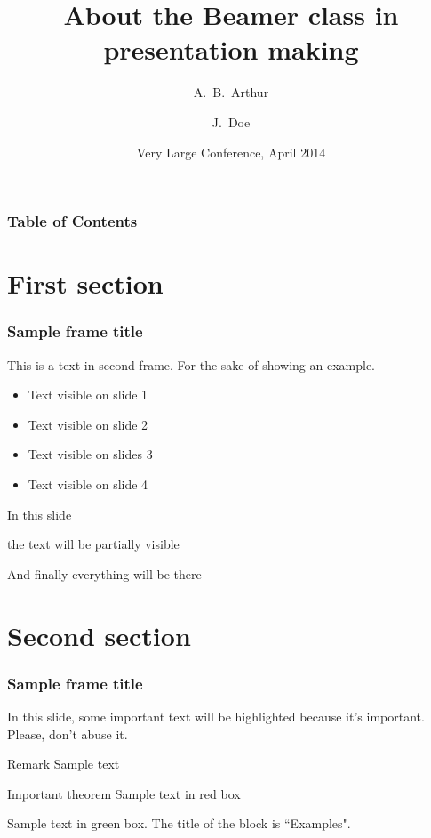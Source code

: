 \documentclass[aspectratio=169]{beamer}
\title[About Beamer] %
{About the Beamer class in presentation making}
\author[Arthur, Doe] %
{A.~B.~Arthur\inst{1} \and J.~Doe\inst{2}}
\institute[VFU] %
{
  \inst{1} Faculty of Physics\\
  Very Famous University
  \and
  \inst{2} Faculty of Chemistry\\
  Very Famous University
}
\date[VLC 2014] %
{Very Large Conference, April 2014}
\begin{document}
\frame{\titlepage}


\begin{frame}
\frametitle{Table of Contents}
\tableofcontents
\end{frame}


\section{First section}

\begin{frame}
\frametitle{Sample frame title}
This is a text in second frame. For the sake of showing an example.

\begin{itemize}
    \item<1-> Text visible on slide 1
    \item<2-> Text visible on slide 2
    \item<3> Text visible on slides 3
    \item<4-> Text visible on slide 4
\end{itemize}
\end{frame}



\begin{frame}
In this slide \pause

the text will be partially visible \pause

And finally everything will be there
\end{frame}

\section{Second section}

\begin{frame}
\frametitle{Sample frame title}

In this slide, some important text will be
\alert{highlighted} because it's important.
Please, don't abuse it.

\begin{block}{Remark}
Sample text
\end{block}

\begin{alertblock}{Important theorem}
Sample text in red box
\end{alertblock}

\begin{examples}
Sample text in green box. The title of the block is ``Examples".
\end{examples}
\end{frame}
\end{document}
